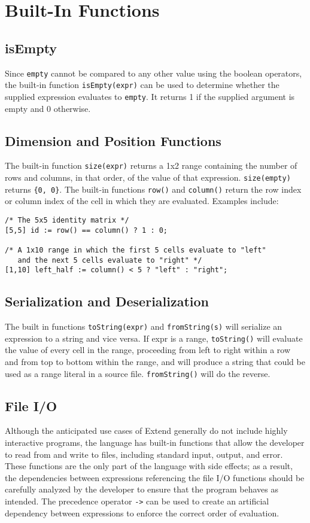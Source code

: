 \section {Built-In Functions}
\subsection{isEmpty}
Since \texttt{empty} cannot be compared to any other value using the boolean operators, the built-in function \texttt{isEmpty(expr)} can be used to determine whether the supplied expression evaluates to \texttt{empty}. It returns 1 if the supplied argument is empty and 0 otherwise.
\subsection{Dimension and Position Functions}
The built-in function \texttt{size(expr)} returns a 1x2 range containing the number of rows and columns, in that order, of the value of that expression. \texttt{size(empty)} returns \texttt{\{0, 0\}}. The built-in functions \texttt{row()} and \texttt{column()} return the row index or column index of the cell in which they are evaluated. Examples include:

\begin{lstlisting}
/* The 5x5 identity matrix */
[5,5] id := row() == column() ? 1 : 0; 

/* A 1x10 range in which the first 5 cells evaluate to "left"
   and the next 5 cells evaluate to "right" */
[1,10] left_half := column() < 5 ? "left" : "right";
\end{lstlisting}
\subsection{Serialization and Deserialization}
The built in functions \texttt{toString(expr)} and \texttt{fromString(s)} will serialize an expression to a string and vice versa. If expr is a range, \texttt{toString()} will evaluate the value of every cell in the range, proceeding from left to right within a row and from top to bottom within the range, and will produce a string that could be used as a range literal in a source file. \texttt{fromString()} will do the reverse.
\subsection{File I/O}
\label{sec:IO}
Although the anticipated use cases of Extend generally do not include highly interactive programs, the language has built-in functions that allow the developer to read from and write to files, including standard input, output, and error. These functions are the only part of the language with side effects; as a result, the dependencies between expressions referencing the file I/O functions should be carefully analyzed by the developer to ensure that the program behaves as intended. The precedence operator \texttt{->} can be used to create an artificial dependency between expressions to enforce the correct order of evaluation.
